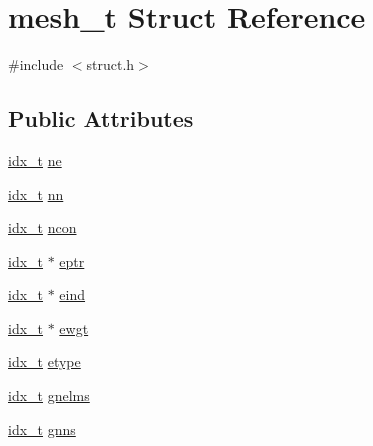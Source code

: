 \hypertarget{structmesh__t}{}\section{mesh\+\_\+t Struct Reference}
\label{structmesh__t}


{\ttfamily \#include $<$struct.\+h$>$}

\subsection*{Public Attributes}
\begin{DoxyCompactItemize}
\item 
\hyperlink{3rd_party_2parmetis-4_80_83_2metis_2include_2metis_8h_aaa5262be3e700770163401acb0150f52}{idx\+\_\+t} \hyperlink{structmesh__t_ac33c0c0c59858834a11754492189e231}{ne}
\item 
\hyperlink{3rd_party_2parmetis-4_80_83_2metis_2include_2metis_8h_aaa5262be3e700770163401acb0150f52}{idx\+\_\+t} \hyperlink{structmesh__t_a6321957b37b2040997c84db2fd2b8427}{nn}
\item 
\hyperlink{3rd_party_2parmetis-4_80_83_2metis_2include_2metis_8h_aaa5262be3e700770163401acb0150f52}{idx\+\_\+t} \hyperlink{structmesh__t_ad18b1da90165616c622c16ce79c6907f}{ncon}
\item 
\hyperlink{3rd_party_2parmetis-4_80_83_2metis_2include_2metis_8h_aaa5262be3e700770163401acb0150f52}{idx\+\_\+t} $\ast$ \hyperlink{structmesh__t_abe330de09173a4faac6dbf76f1ae90f8}{eptr}
\item 
\hyperlink{3rd_party_2parmetis-4_80_83_2metis_2include_2metis_8h_aaa5262be3e700770163401acb0150f52}{idx\+\_\+t} $\ast$ \hyperlink{structmesh__t_aea23f507e73665abf78ffc3ecc540210}{eind}
\item 
\hyperlink{3rd_party_2parmetis-4_80_83_2metis_2include_2metis_8h_aaa5262be3e700770163401acb0150f52}{idx\+\_\+t} $\ast$ \hyperlink{structmesh__t_a0a2369b26fbcc6229681ec8cb9e8f713}{ewgt}
\item 
\hyperlink{3rd_party_2parmetis-4_80_83_2metis_2include_2metis_8h_aaa5262be3e700770163401acb0150f52}{idx\+\_\+t} \hyperlink{structmesh__t_a6310e3f72d750dd2f477dc6bbc3d6c1c}{etype}
\item 
\hyperlink{3rd_party_2parmetis-4_80_83_2metis_2include_2metis_8h_aaa5262be3e700770163401acb0150f52}{idx\+\_\+t} \hyperlink{structmesh__t_ad2a13c39ecaddc9add6afe612f05bea4}{gnelms}
\item 
\hyperlink{3rd_party_2parmetis-4_80_83_2metis_2include_2metis_8h_aaa5262be3e700770163401acb0150f52}{idx\+\_\+t} \hyperlink{structmesh__t_ad534138460141cd611dc0fae1baf8346}{gnns}

\end{DoxyCompactItemize}
